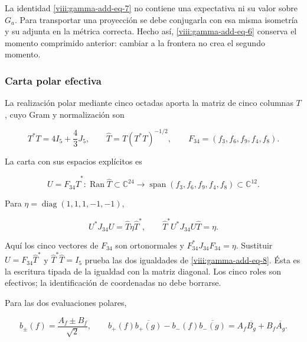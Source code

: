 La identidad \eqref{viii:gamma-add-eq-7} no contiene una expectativa ni su valor sobre \(G_a\). Para transportar una proyección se debe conjugarla con esa misma isometría y su adjunta en la métrica correcta. Hecho así, \eqref{viii:gamma-add-eq-6} conserva el momento comprimido anterior: cambiar a la frontera no crea el segundo momento.

\subsubsection{Carta polar efectiva}
\label{viii:gamma-add-sub-220}

La realización polar mediante cinco octadas aporta la matriz de cinco
columnas \(T\), cuyo Gram y normalización son

\begin{equation}
T^*T=4I_5+\frac43J_5,\qquad
\widehat T=T(T^*T)^{-1/2},\qquad
F_{34}=(f_3,f_6,f_9,f_4,f_8).
\label{viii:gamma-add-display-18}
\end{equation}

La carta con sus espacios explícitos es

\begin{equation}
U=F_{34}\widehat T^*:
\operatorname{Ran}\widehat T\subset\mathbb C^{24}
\longrightarrow\operatorname{span}(f_3,f_6,f_9,f_4,f_8)\subset\mathbb C^{12}.
\label{viii:gamma-add-display-19}
\end{equation}

Para \(\eta=\operatorname{diag}(1,1,1,-1,-1)\),

\begin{equation}
U^*J_{34}U=\widehat T\eta\widehat T^*,\qquad
\widehat T^*U^*J_{34}U\widehat T=\eta.
\label{viii:gamma-add-eq-8}
\end{equation}

Aquí los cinco vectores de \(F_{34}\) son ortonormales y
\(F_{34}^*J_{34}F_{34}=\eta\). Sustituir
\(U=F_{34}\widehat T^*\) y \(\widehat T^*\widehat T=I_5\)
prueba las dos igualdades de \eqref{viii:gamma-add-eq-8}.
Ésta es la escritura tipada de la igualdad con la matriz diagonal.
Los cinco roles son efectivos; la identificación de coordenadas no
debe borrarse.

Para las dos evaluaciones polares,

\begin{equation}
b_\pm(f)=\frac{A_f\pm B_f}{\sqrt2},\qquad
b_+(f)\overline{b_+(g)}-b_-(f)\overline{b_-(g)}
=A_f\overline{B_g}+B_f\overline{A_g}.
\label{viii:gamma-add-eq-9}
\end{equation}

